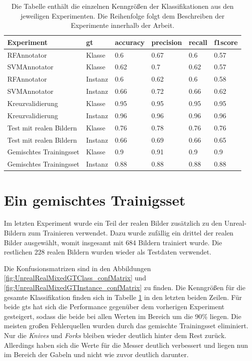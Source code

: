 \begin{table}
\centering
{}
\begin{tabularx}{\textwidth}{Xlllll}
\textbf{Experiment}	&	\textbf{\gls{gt}}	& \textbf{\gls{accuracy}} & \textbf{\gls{precision}}	& \textbf{\gls{recall}}	& \textbf{\gls{f1score}} \\ \hline
RFAnnotator				&Klasse		&0.6	&0.67	&0.6	&0.57	\\
SVMAnnotator			&Klasse		&0.62	&0.7	&0.62	&0.57	\\
RFAnnotator				&Instanz	&0.6	&0.62	&0.6	&0.58	\\
SVMAnnotator			&Instanz	&0.66	&0.72	&0.66	&0.62	\\ \hline
Kreuzvalidierung		&Klasse		&0.95	&0.95	&0.95	&0.95	\\
Kreuzvalidierung		&Instanz	&0.96	&0.96	&0.96	&0.96	\\ \hline
Test mit realen Bildern	&Klasse		&0.76	&0.78	&0.76	&0.76	\\
Test mit realen Bildern	&Instanz	&0.66	&0.69	&0.66	&0.65	\\ \hline
Gemischtes Trainingsset	&Klasse		&0.9	&0.91	&0.9	&0.9	\\
Gemischtes Trainingsset	&Instanz	&0.88	&0.88	&0.88	&0.88	\\
\end{tabularx}
\caption[Übersicht der Kenngrößen der einzelnen Experimente]{Die Tabelle enthält die einzelnen Kenngrößen der Klassifikationen aus den jeweiligen Experimenten. Die Reihenfolge folgt dem Beschreiben der Experimente innerhalb der Arbeit.}
\label{tab:classification_all}
\end{table}

\section{Ein gemischtes Trainigsset}
\label{unrealrealmixed}

Im letzten Experiment wurde ein Teil der realen Bilder zusätzlich zu den Unreal-Bildern zum Trainieren verwendet. Dazu wurde zufällig ein drittel der realen Bilder ausgewählt, womit insgesamt mit 684 Bildern trainiert wurde. Die restlichen 228 realen Bildern wurden wieder als Testdaten verwendet. \par

Die Konfusionsmatrizen sind in den Abbildungen \ref{fig:UnrealRealMixedGTClass_confMatrix} und \ref{fig:UnrealRealMixedGTInstance_confMatrix} zu finden. Die Kenngrößen für die gesamte Klassifikation finden sich in Tabelle \ref{tab:classification_all} in den letzten beiden Zeilen. Für beide \gls{gt}s hat sich die Performance gegenüber dem vorherigen Experiment gesteigert, sodass die beide bei allen Werten im Bereich um die 90\% liegen. Die meisten großen Fehlerquellen wurden durch das gemischte Trainingsset eliminiert. Nur die \textit{Knives} und \textit{Forks} bleiben wieder deutlich hinter dem Rest zurück. Allerdings haben sich die Werte für die Messer deutlich verbessert und liegen nun im Bereich der Gabeln und nicht wie zuvor deutlich darunter.   

